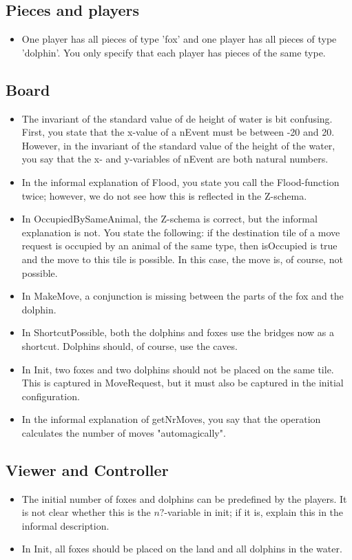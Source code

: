 \documentclass[a4paper,11pt]{article}
\begin{document}
    \subsection{Pieces and players}
    \begin{itemize}
        \item One player has all pieces of type 'fox' and one player has all pieces of type 'dolphin'. You only specify that each player has pieces of the same type.
    \end{itemize}

    \subsection{Board}
    \begin{itemize}
        \item The invariant of the standard value of de height of water is bit confusing. First, you state that the x-value of a nEvent must be between -20 and 20. However, in the invariant of the standard value of the height of the water, you say that the x- and y-variables of nEvent are both natural numbers.
        \item In the informal explanation of Flood, you state you call the Flood-function twice; however, we do not see how this is reflected in the Z-schema.
        \item In OccupiedBySameAnimal, the Z-schema is correct, but the informal explanation is not. You state the following: if the destination tile of a move request is occupied by an animal of the same type, then isOccupied is true and the move to this tile is possible. In this case, the move is, of course, not possible.
        \item In MakeMove, a conjunction is missing between the parts of the fox and the dolphin.
        \item In ShortcutPossible, both the dolphins and foxes use the bridges now as a shortcut. Dolphins should, of course, use the caves.
        \item In Init, two foxes and two dolphins should not be placed on the same tile. This is captured in MoveRequest, but it must also be captured in the initial configuration.
        \item In the informal explanation of getNrMoves, you say that the operation calculates the number of moves "automagically".
    \end{itemize}

    \subsection{Viewer and Controller}
    \begin{itemize}
        \item The initial number of foxes and dolphins can be predefined by the players. It is not clear whether this is the $n?$-variable in init; if it is, explain this in the informal description.
        \item In Init, all foxes should be placed on the land and all dolphins in the water.
    \end{itemize}
\end{document}
